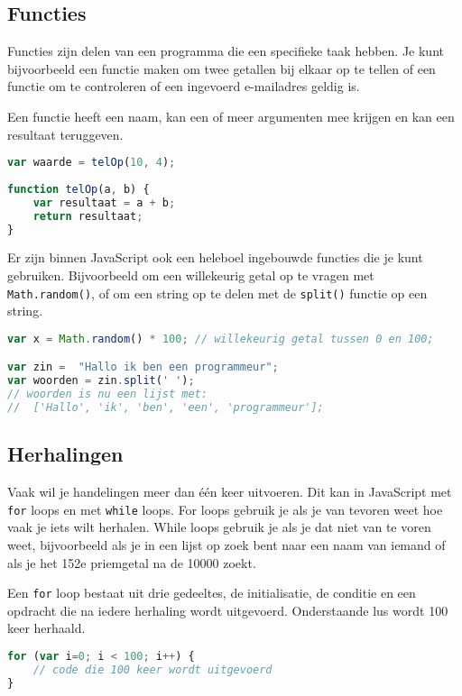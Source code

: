 \documentclass[8pt,pagesize,footinclude=false,headinclude=false]{scrartcl}
\begin{document}
\begin{multicols*}{3}
\subsection*{Functies}
Functies zijn delen van een programma die een specifieke taak hebben. Je kunt bijvoorbeeld een functie maken om twee getallen bij elkaar op te tellen of een functie om te controleren of een ingevoerd e-mailadres geldig is.

Een functie heeft een naam, kan een of meer argumenten mee krijgen en kan een resultaat teruggeven.
\begin{lstlisting}[language=JavaScript]
var waarde = telOp(10, 4); 
	
function telOp(a, b) {
	var resultaat = a + b;
	return resultaat;
}
\end{lstlisting}
\noindent Er zijn binnen JavaScript ook een heleboel ingebouwde functies die je kunt gebruiken. Bijvoorbeeld om een willekeurig getal op te vragen met \texttt{Math.random()}, of om een string op te delen met de \texttt{split()} functie op een string.

\begin{lstlisting}[language=JavaScript]
var x = Math.random() * 100; // willekeurig getal tussen 0 en 100;

var zin =  "Hallo ik ben een programmeur";
var woorden = zin.split(' '); 
// woorden is nu een lijst met:
//  ['Hallo', 'ik', 'ben', 'een', 'programmeur'];
\end{lstlisting}

\subsection*{Herhalingen}
Vaak wil je handelingen meer dan \'e\'en keer uitvoeren. Dit kan in JavaScript met \texttt{for} loops en met \texttt{while} loops. For loops gebruik je als je van tevoren weet hoe vaak je iets wilt herhalen. While loops gebruik je als je dat niet van te voren weet, bijvoorbeeld als je in een lijst op zoek bent naar een naam van iemand of als je het 152e priemgetal na de 10000 zoekt.

Een \texttt{for} loop bestaat uit drie gedeeltes, de initialisatie, de conditie en een opdracht die na iedere herhaling wordt uitgevoerd. Onderstaande lus wordt 100 keer herhaald.

\begin{lstlisting}[language=JavaScript]
for (var i=0; i < 100; i++) {
	// code die 100 keer wordt uitgevoerd
}
\end{lstlisting}


\end{multicols*}
\end{document}
